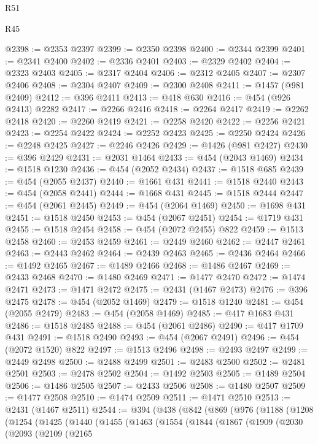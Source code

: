 \begin{lexlean}{R51}
\begin{lexlean}{R45}
\begin{coremodule}
{{{{{{{{{{{{{{{{{{{{{{{{{{{{{{{{{{{{{{{{{{{{{{{{{{{{{{{{{{{{{{{{{{{{{{{{{{{{{{{{{{{{{{{{{{{@2398 := @2353 @2397
@2399 := @2350 @2398
@2400 := @2344 @2399
@2401 := @2341 @2400
@2402 := @2336 @2401
@2403 := @2329 @2402
@2404 := @2323 @2403
@2405 := @2317 @2404
@2406 := @2312 @2405
@2407 := @2307 @2406
@2408 := @2304 @2407
@2409 := @2300 @2408
@2411 := @1457 (@981 @2409)
@2412 := @396 @2411
@2413 := @418 @630
@2416 := @454 (@926 @2413) @2282
@2417 := @2266 @2416
@2418 := @2264 @2417
@2419 := @2262 @2418
@2420 := @2260 @2419
@2421 := @2258 @2420
@2422 := @2256 @2421
@2423 := @2254 @2422
@2424 := @2252 @2423
@2425 := @2250 @2424
@2426 := @2248 @2425
@2427 := @2246 @2426
@2429 := @1426 (@981 @2427)
@2430 := @396 @2429
@2431 := @2031 @1464
@2433 := @454 (@2043 @1469)
@2434 := @1518 @1230
@2436 := @454 (@2052 @2434)
@2437 := @1518 @685
@2439 := @454 (@2055 @2437)
@2440 := @1661 @431
@2441 := @1518 @2440
@2443 := @454 (@2058 @2441)
@2444 := @1668 @431
@2445 := @1518 @2444
@2447 := @454 (@2061 @2445)
@2449 := @454 (@2064 @1469)
@2450 := @1698 @431
@2451 := @1518 @2450
@2453 := @454 (@2067 @2451)
@2454 := @1719 @431
@2455 := @1518 @2454
@2458 := @454 (@2072 @2455) @822
@2459 := @1513 @2458
@2460 := @2453 @2459
@2461 := @2449 @2460
@2462 := @2447 @2461
@2463 := @2443 @2462
@2464 := @2439 @2463
@2465 := @2436 @2464
@2466 := @1492 @2465
@2467 := @1489 @2466
@2468 := @1486 @2467
@2469 := @2433 @2468
@2470 := @1480 @2469
@2471 := @1477 @2470
@2472 := @1474 @2471
@2473 := @1471 @2472
@2475 := @2431 (@1467 @2473)
@2476 := @396 @2475
@2478 := @454 (@2052 @1469)
@2479 := @1518 @1240
@2481 := @454 (@2055 @2479)
@2483 := @454 (@2058 @1469)
@2485 := @417 @1683 @431
@2486 := @1518 @2485
@2488 := @454 (@2061 @2486)
@2490 := @417 @1709 @431
@2491 := @1518 @2490
@2493 := @454 (@2067 @2491)
@2496 := @454 (@2072 @1520) @822
@2497 := @1513 @2496
@2498 := @2493 @2497
@2499 := @2449 @2498
@2500 := @2488 @2499
@2501 := @2483 @2500
@2502 := @2481 @2501
@2503 := @2478 @2502
@2504 := @1492 @2503
@2505 := @1489 @2504
@2506 := @1486 @2505
@2507 := @2433 @2506
@2508 := @1480 @2507
@2509 := @1477 @2508
@2510 := @1474 @2509
@2511 := @1471 @2510
@2513 := @2431 (@1467 @2511)
@2544 := @394
    (@438
      (@842
        (@869
          (@976
            (@1188
              (@1208
                (@1254
                  (@1425
                    (@1440
                      (@1455
                        (@1463
                          (@1554
                            (@1844
                              (@1867
                                (@1909
                                  (@2030
                                    (@2093
                                      (@2109
                                        (@2165
}}}}}}}}}}}}}}}}}}}}}}}}}}}}}}}}}}}}}}}}}}}}}}}}}}}}}}}}}}}}}}}}}}}}}}}}}}}}}}}}}}}}}}}}}}}
\end{coremodule}
\end{lexlean}
\end{lexlean}
